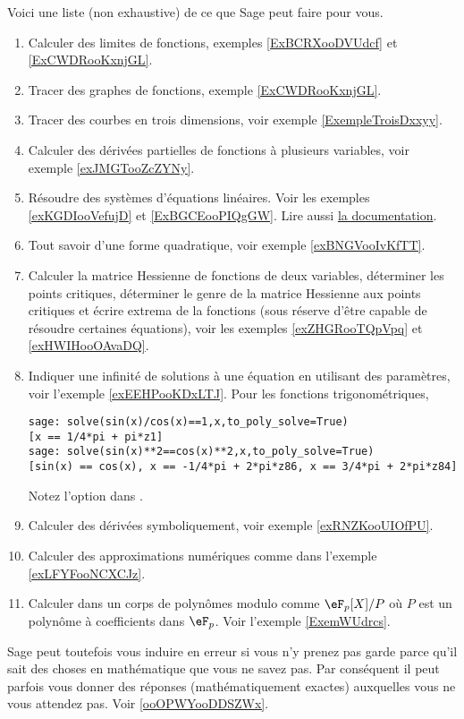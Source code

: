 Voici une liste (non exhaustive) de ce que Sage peut faire pour vous.
\begin{enumerate}

	\item
        Calculer des limites de fonctions, exemples \ref{ExBCRXooDVUdcf} et \ref{ExCWDRooKxnjGL}.
	\item
        Tracer des graphes de fonctions, exemple \ref{ExCWDRooKxnjGL}.
	\item
        Tracer des courbes en trois dimensions, voir exemple \ref{ExempleTroisDxxyy}. 
	\item
		Calculer des dérivées partielles de fonctions à plusieurs variables, voir exemple \ref{exJMGTooZcZYNy}.
	\item
        Résoudre des systèmes d'équations linéaires. Voir les exemples \ref{exKGDIooVefujD} et \ref{ExBGCEooPIQgGW}. Lire aussi \href{http://www.sagemath.org/doc/constructions/linear_algebra.html#solving-systems-of-linear-equations}{la documentation}.
	\item
        Tout savoir d'une forme quadratique, voir exemple \ref{exBNGVooIvKfTT}.
	\item
        Calculer la matrice Hessienne de fonctions de deux variables, déterminer les points critiques, déterminer le genre de la matrice Hessienne aux points critiques et écrire extrema de la fonctions (sous réserve d'être capable de résoudre certaines équations), voir les exemples \ref{exZHGRooTQpVpq} et \ref{exHWIHooOAvaDQ}.
	\item
        Indiquer une infinité de solutions à une équation en utilisant des paramètres, voir l'exemple \ref{exEEHPooKDxLTJ}. Pour les fonctions trigonométriques, 
        \begin{verbatim}
sage: solve(sin(x)/cos(x)==1,x,to_poly_solve=True)                                                         
[x == 1/4*pi + pi*z1]
sage: solve(sin(x)**2==cos(x)**2,x,to_poly_solve=True)
[sin(x) == cos(x), x == -1/4*pi + 2*pi*z86, x == 3/4*pi + 2*pi*z84]
        \end{verbatim}

        Notez l'option  dans .

	\item
        Calculer des dérivées symboliquement, voir exemple \ref{exRNZKooUIOfPU}.
	\item
        Calculer des approximations numériques comme dans l'exemple \ref{exLFYFooNCXCJz}.
    \item
        Calculer dans un corps de polynômes modulo comme \( \eF_p[X]/P\) où \( P\) est un polynôme à coefficients dans \( \eF_p\). Voir l'exemple \ref{ExemWUdrcs}.
\end{enumerate}

Sage peut toutefois vous induire en erreur si vous n'y prenez pas garde parce qu'il sait des choses en mathématique que vous ne savez pas. Par conséquent il peut parfois vous donner des réponses (mathématiquement exactes) auxquelles vous ne vous attendez pas. Voir \ref{ooOPWYooDDSZWx}.
